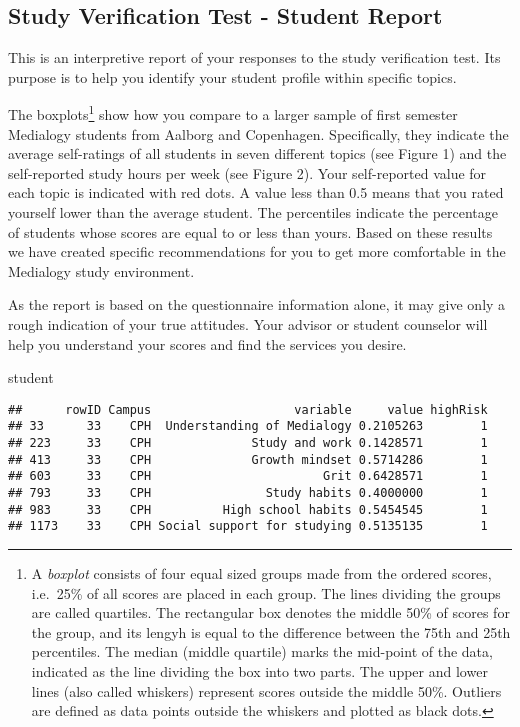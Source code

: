 \documentclass[]{article}
\title{}
\author{}
\date{}
\newenvironment{Shaded}{\begin{snugshade}}{\end{snugshade}}
\newcommand{\NormalTok}[1]{{#1}}
\let\rmarkdownfootnote\footnote%
\def\footnote{\protect\rmarkdownfootnote}
\begin{document}
\subsection{Study Verification Test - Student
Report}\label{study-verification-test---student-report}

This is an interpretive report of your responses to the study
verification test. Its purpose is to help you identify your student
profile within specific topics.

The boxplots\footnote{A \emph{boxplot} consists of four equal sized
  groups made from the ordered scores, i.e.~25\% of all scores are
  placed in each group. The lines dividing the groups are called
  quartiles. The rectangular box denotes the middle 50\% of scores for
  the group, and its lengyh is equal to the difference between the 75th
  and 25th percentiles. The median (middle quartile) marks the mid-point
  of the data, indicated as the line dividing the box into two parts.
  The upper and lower lines (also called whiskers) represent scores
  outside the middle 50\%. Outliers are defined as data points outside
  the whiskers and plotted as black dots.} show how you compare to a
larger sample of first semester Medialogy students from Aalborg and
Copenhagen. Specifically, they indicate the average self-ratings of all
students in seven different topics (see Figure 1) and the self-reported
study hours per week (see Figure 2). Your self-reported value for each
topic is indicated with red dots. A value less than 0.5 means that you
rated yourself lower than the average student. The percentiles indicate
the percentage of students whose scores are equal to or less than yours.
Based on these results we have created specific recommendations for you
to get more comfortable in the Medialogy study environment.

As the report is based on the questionnaire information alone, it may
give only a rough indication of your true attitudes. Your advisor or
student counselor will help you understand your scores and find the
services you desire.

\begin{Shaded}
\begin{Highlighting}[]
\NormalTok{student}
\end{Highlighting}
\end{Shaded}

\begin{verbatim}
##      rowID Campus                    variable     value highRisk
## 33      33    CPH  Understanding of Medialogy 0.2105263        1
## 223     33    CPH              Study and work 0.1428571        1
## 413     33    CPH              Growth mindset 0.5714286        1
## 603     33    CPH                        Grit 0.6428571        1
## 793     33    CPH                Study habits 0.4000000        1
## 983     33    CPH          High school habits 0.5454545        1
## 1173    33    CPH Social support for studying 0.5135135        1
\end{verbatim}
\end{document}
